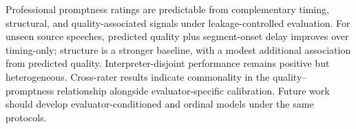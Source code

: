 Professional promptness ratings are predictable from complementary timing, structural, and quality-associated signals under leakage-controlled evaluation. For unseen source speeches, predicted quality plus segment-onset delay improves over timing-only; structure is a stronger baseline, with a modest additional association from predicted quality. Interpreter-disjoint performance remains positive but heterogeneous. Cross-rater results indicate commonality in the quality--promptness relationship alongside evaluator-specific calibration. Future work should develop evaluator-conditioned and ordinal models under the same protocols.
